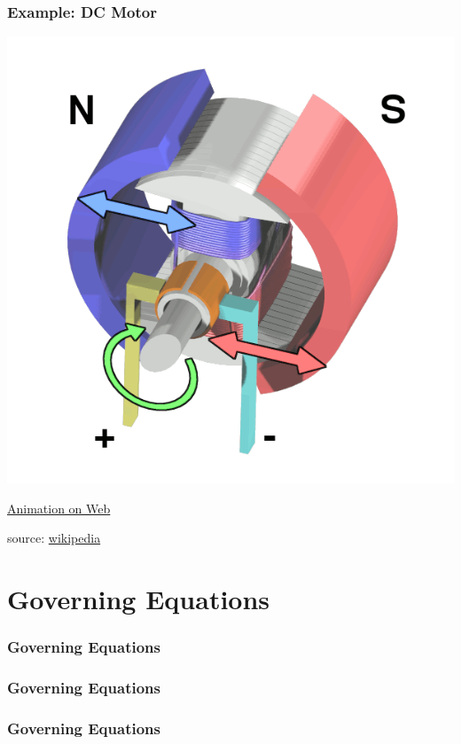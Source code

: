 \documentclass{beamer}                  %
\newcommand{\sectiontitleII}{Example: DC Motor}
\newcommand{\sectiontitleIII}{Governing Equations}
\begin{document}
	\begin{frame} \small
		\frametitle{\sectiontitleII}

		\includegraphics[scale=.25]{Electric_motor_cycle_2.png}

		\href{https://en.wikipedia.org/wiki/DC_motor}{Animation on Web} 

		\btVFill
		\tiny{source: \href{https://en.wikipedia.org/wiki/DC_motor}{wikipedia}}
	\end{frame}	

\section{\sectiontitleIII}

	\begin{frame}[label=sectionIII] \small
		\frametitle{\sectiontitleIII}
		

		\btVFill
	\end{frame}	
	
	\begin{frame} \small
		\frametitle{\sectiontitleIII}
		
		\btVFill
	\end{frame}	

	\begin{frame} \small
		\frametitle{\sectiontitleIII}

		

			
	\end{frame}	
\end{document}
